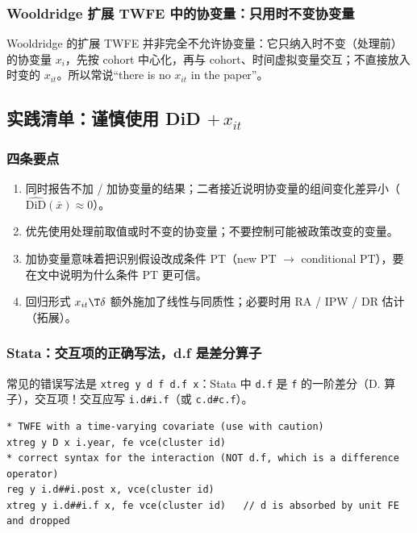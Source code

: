 \subsubsection{Wooldridge 扩展 TWFE 中的协变量：只用时不变协变量}

Wooldridge 的扩展 TWFE 并非完全不允许协变量：它只纳入时不变（处理前）的协变量 $x_i$，先按 cohort 中心化，再与 cohort、时间虚拟变量交互；不直接放入时变的 $x_{it}$。所以常说“there is no $x_{it}$ in the paper”。

\subsection{实践清单：谨慎使用 DiD \texorpdfstring{$+\,x_{it}$}{+ x\_it}}

\subsubsection{四条要点}

\begin{method}
\begin{enumerate}
  \item 同时报告不加 / 加协变量的结果；二者接近说明协变量的组间变化差异小（$\widehat{\mathrm{DiD}}(\bar x)\approx0$）。
  \item 优先使用处理前取值或时不变的协变量；不要控制可能被政策改变的变量。
  \item 加协变量意味着把识别假设改成条件 PT（new PT $\to$ conditional PT），要在文中说明为什么条件 PT 更可信。
  \item 回归形式 $x_{it}\T\delta$ 额外施加了线性与同质性；必要时用 RA / IPW / DR 估计（拓展）。
\end{enumerate}
\end{method}

\subsubsection{Stata：交互项的正确写法，d.f 是差分算子}

常见的错误写法是 \texttt{xtreg y d f d.f x}：Stata 中 \texttt{d.f} 是 \texttt{f} 的一阶差分（D. 算子），交互项！交互应写 \texttt{i.d\#i.f}（或 \texttt{c.d\#c.f}）。
\begin{lstlisting}
* TWFE with a time-varying covariate (use with caution)
xtreg y D x i.year, fe vce(cluster id)
* correct syntax for the interaction (NOT d.f, which is a difference operator)
reg y i.d##i.post x, vce(cluster id)
xtreg y i.d##i.f x, fe vce(cluster id)   // d is absorbed by unit FE and dropped
\end{lstlisting}

